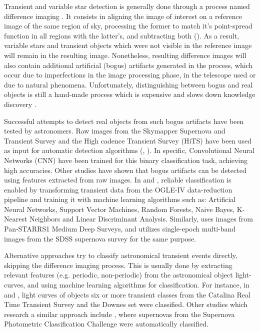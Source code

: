 Transient and variable star detection is generally done through a process named difference imaging \cite{1507.05137} \cite{1608.01733} \cite{1708.02850}. It consists in aligning the image of interest on a reference image of the same region of sky, processing the former to match it's point-spread function in all regions with the latter's, and subtracting both (\cite{astro-ph/9712287}). As a result, variable stars and transient objects which were not visible in the reference image will remain in the resulting image. Nonetheless, resulting difference images will also contain additional artificial (bogus) artifacts generated in the process, which occur due to imperfections in the image processing phase, in the telescope used or due to natural phenomena. Unfortunately, distinguishing between bogus and real objects is still a hand-made process which is expensive and slows down knowledge discovery \cite{2011arXiv1110.4655D}.


Successful attempts to detect real objects from such bogus artifacts have been tested by astronomers. Raw images from the  Skymapper Supernova and Transient Survey and the High cadence Transient Survey (HiTS) have been used as input for automatic detection algorithms (\cite{1708.08947}, \cite{1701.00458}). In specific, Convolutional Neural Networks (CNN) have been trained for this binary classification task, achieving high accuracies. Other studies have shown that bogus artifacts can be detected using features extracted from raw images. In \cite{1601.06151} and \cite{1601.06320}, reliable classification is enabled by transforming transient data from the OGLE-IV data-reduction pipeline and training it with machine learning algorithms such as: Artificial Neural Networks, Support Vector Machines, Random Forests, Naive Bayes, K-Nearest Neighbors and Linear Discriminant Analysis. Similarly, \cite{1501.05470} uses images from Pan-STARRS1 Medium Deep Surveys, and \cite{1407.4118} utilizes single-epoch multi-band images from the SDSS supernova survey for the same purpose.



Alternative approaches try to classify astronomical transient events directly, skipping the difference imaging process.
This is usually done by extracting relevant features (e.g. periodic, non-periodic) from the astronomical object light-curves, and using machine learning algorithms for classification. For instance, in \cite{1401.3211} and \cite{1601.03931}, light curves of objects six or more transient classes from the Catalina Real Time Transient Survey and the Downes set \cite{d05} were classified. Other studies which research a similar approach include \cite{1603.00882}, where supernovas from the Supernova Photometric Classification Challenge were automatically classified.

